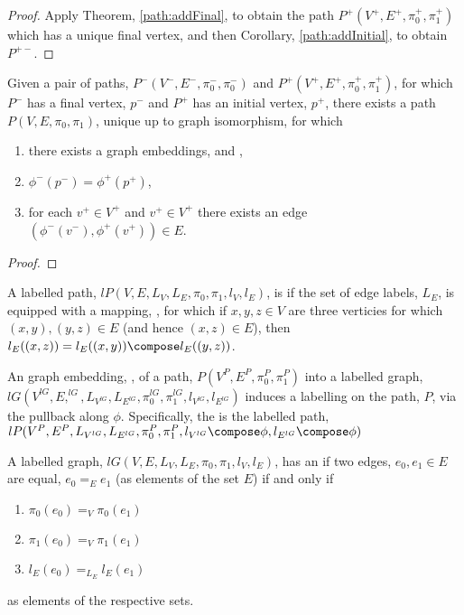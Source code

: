 \documentclass[a4paper]{amsart}
\begin{document}
\begin{proof}
Apply Theorem, \ref{path:addFinal}, to obtain the path $P^+(V^+, E^+, \pi^+_0, \pi^+_1)$
which has a unique final vertex, and then Corollary, \ref{path:addInitial}, to obtain
$P^{+-}$.
\end{proof}

\begin{theorem}
Given a pair of paths, $P^-(V^-, E^-, \pi^-_0, \pi^-_0)$ and $P^+(V^+, E^+, \pi^+_0,
\pi^+_1)$, for which $P^-$ has a final vertex, $p^-$ and $P^+$ has an initial vertex,
$p^+$, there exists a path $P(V, E, \pi_0, \pi_1)$, unique up to graph isomorphism, for
which
\begin{enumerate}
\item there exists a graph embeddings,  and ,
\item $\phi^-(p^-) = \phi^+(p^+)$,
\item for each $v^+ \in V^+$ and $v^+ \in V^+$ there exists an edge $(\phi^-(v^-), 
\phi^+(v^+)) \in E$.
\end{enumerate}
\end{theorem}

\begin{proof}
\end{proof}


\begin{definition}
A labelled path, $lP(V, E, L_V, L_E, \pi_0, \pi_1, l_V, l_E)$, is  if the set of edge labels, $L_E$, is equipped with a mapping,
, for which if $x, y, z \in V$ are three verticies for 
which $(x,y), (y,z) \in E$ (and hence $(x,z) \in E$), then $l_E((x,z)) = l_E((x,y)) \compose 
l_E((y,z))$.
\end{definition}

\begin{definition}
An graph embedding, , of a path, $P(V^P, E^P, \pi^P_0, \pi^P_1)$ into a 
labelled graph, $lG(V^{lG}, E,^{lG}, L_{V^{lG}}, L_{E^{lG}}, \pi^{lG}_0, \pi^{lG}_1, 
l_{V^{lG}}, l_{E^{lG}})$ induces a labelling on the path, $P$, via the pullback along 
$\phi$. Specifically, the  is the labelled path, $lP(V^P, E^P, 
L_{V^{lG}}, L_{E^{lG}}, \pi^P_0, \pi^P_1, l_{V^{lG}} \compose \phi, l_{E^{lG}} \compose 
\phi)$
\end{definition}

\begin{definition}
A labelled graph, $lG(V, E, L_V, L_E, \pi_0, \pi_1, l_V, l_E)$, has an  if two edges, $e_0, e_1 \in E$ are equal, $e_0 =_E e_1$ (as elements of
the set $E$) if and only if
\begin{enumerate}
\item $\pi_0(e_0) =_V \pi_0(e_1)$
\item $\pi_1(e_0) =_V \pi_1(e_1)$
\item $l_E(e_0) =_{L_E} l_E(e_1)$
\end{enumerate}
as elements of the respective sets.
\end{definition}
\end{document}
